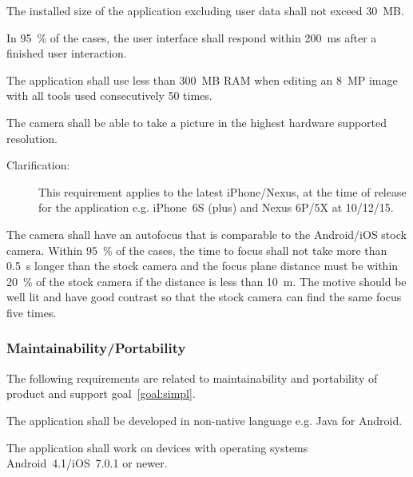 \documentclass[10pt,a4paper]{article}
\begin{document}
\begin{description}
	\item [Req \thesubsubsection {.\theperf} Application size] The installed size of the application excluding user data shall not exceed 30~MB.	

	\item [Req \thesubsubsection {.\theperf} User interface speed] In 95~\% of the cases, the user interface shall respond within 200~ms after a finished user interaction.

	\item [Req \thesubsubsection {.\theperf} Memory] The application shall use less than 300~MB RAM when editing an 8~MP image with all tools used consecutively 50 times.
	\item [Req \thesubsubsection {.\theperf} Picture quality] The camera shall be able to take a picture in the highest hardware supported resolution. 
	\begin{description}
	 \item[Clarification:] This requirement applies to the latest iPhone/Nexus, at the time of release for the application e.g. iPhone~6S (plus) and Nexus 6P/5X at 10/12/15.
	 \end{description}
	\item [Req \thesubsubsection {.\theperf} Autofocus] The camera shall have an autofocus that is comparable to the Android/iOS stock camera. Within 95~\% of the cases, the time to focus shall not take more than 0.5~s longer than the stock camera and the focus plane distance must be within 20~\% of the stock camera if the distance is less than 10~m. The motive should be well lit and have good contrast so that the stock camera can find the same focus five times. 
\end{description}

\subsubsection{Maintainability/Portability}
The following requirements are related to maintainability and portability of product and support goal~\ref{goal:simpl}.

\begin{description}
	\item [Req \thesubsubsection {.\themapo} Language] The application shall be developed in non-native language e.g. Java for Android. 
	\item [Req \thesubsubsection {.\themapo} Device support] The application shall work on devices with operating systems Android~4.1/iOS~7.0.1 or newer.
\end{description}
\end{document}

